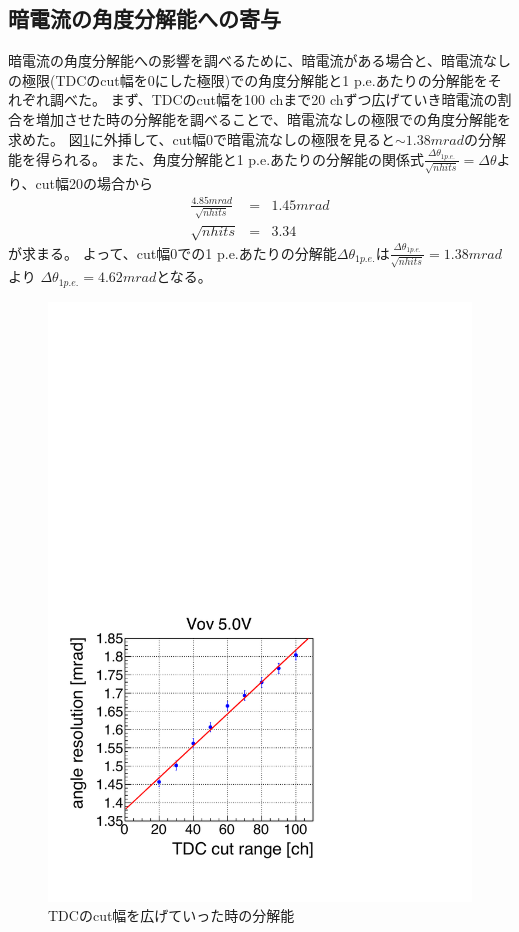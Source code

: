 \documentclass[uplatex, titlepage, dvipdfmx, 12pt, a4paper]{jsreport}
\begin{document}
    \subsection{暗電流の角度分解能への寄与}
    暗電流の角度分解能への影響を調べるために、暗電流がある場合と、暗電流なしの極限(TDCのcut幅を0にした極限)での角度分解能と1 p.e.あたりの分解能をそれぞれ調べた。
    まず、TDCのcut幅を100 chまで20 chずつ広げていき暗電流の割合を増加させた時の分解能を調べることで、暗電流なしの極限での角度分解能を求めた。
    図\ref{fig:reso_tdc}に外挿して、cut幅0で暗電流なしの極限を見ると$\sim 1.38 \si{mrad}$の分解能を得られる。
    また、角度分解能と1 p.e.あたりの分解能の関係式$\frac{\Delta \theta_{1 p.e.}}{\sqrt{nhits}}=\Delta \theta$より、cut幅20の場合から
    \begin{eqnarray}
      \frac{4.85 \si{mrad}}{\sqrt{nhits}}&=&1.45 \si{mrad} \nonumber \\
      \sqrt{nhits} &=& 3.34 \nonumber 
    \end{eqnarray}
    が求まる。
    よって、cut幅0での1 p.e.あたりの分解能$\Delta \theta_{1 p.e.}$は$\frac{\Delta \theta_{1 p.e.}}{\sqrt{nhits}}=1.38 \si{mrad}$より
    $\Delta\theta_{1 p.e.}=4.62 \si{mrad}$となる。
    \begin{figure}[h]
      \begin{center} 
        \includegraphics[scale=0.4, clip]{image/reso_tdc.pdf}
        \caption{TDCのcut幅を広げていった時の分解能} 
        \label{fig:reso_tdc} 
      \end{center}
    \end{figure}
\end{document}
